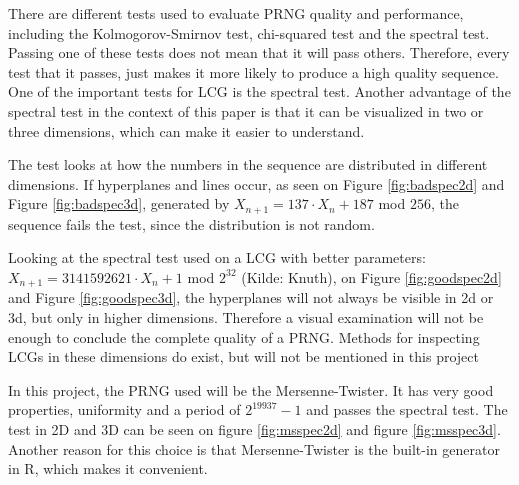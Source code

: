 \noindent There are different tests used to evaluate PRNG quality and performance, including the Kolmogorov-Smirnov test, chi-squared test and the spectral test. Passing one of these tests does not mean that it will pass others. Therefore, every test that it passes, just makes it more likely to produce a high quality sequence. One of the important tests for LCG is the spectral test. Another advantage of the spectral test in the context of this paper is that it can be visualized in two or three dimensions, which can make it easier to understand.
\newline

\noindent The test looks at how the numbers in the sequence are distributed in different dimensions. If hyperplanes and lines occur, as seen on Figure \ref{fig:badspec2d} and Figure \ref{fig:badspec3d}, generated by $X_{n+1}=137\cdot X_{n}+187$ mod $256$, the sequence fails the test, since the distribution is not random.
\newline

\noindent Looking at the spectral test used on a LCG with better parameters:  $X_{n+1}=3 141 592 621\cdot X_{n}+1$ mod $2^{32}$ (Kilde: Knuth), on Figure \ref{fig:goodspec2d} and Figure \ref{fig:goodspec3d}, the hyperplanes will not always be visible in 2d or 3d, but only in higher dimensions. Therefore a visual examination will not be enough to conclude the complete quality of a PRNG. Methods for inspecting LCGs in these dimensions do exist, but will not be mentioned in this project
\newline

\noindent In this project, the PRNG used will be the Mersenne-Twister. It has very good properties, uniformity and a period of $2^19937-1$ and passes the spectral test. The test in 2D and 3D can be seen on figure \ref{fig:msspec2d} and figure \ref{fig:msspec3d}. Another reason for this choice is that Mersenne-Twister is the built-in generator in R, which makes it convenient. 
\newpage

